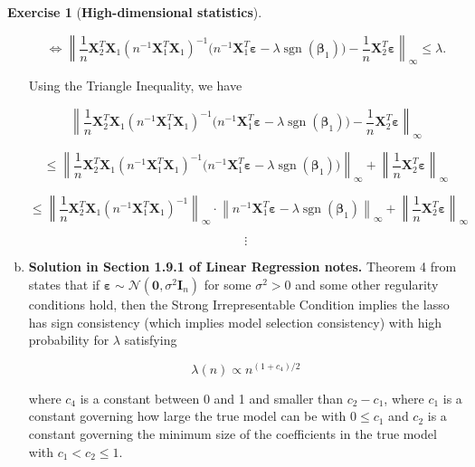 \documentclass{article}
\theoremstyle{definition}
\newtheorem{exercise}{Exercise}
\theoremstyle{definition}
\theoremstyle{definition}
\theoremstyle{definition}
\renewcommand{\epsilon}{\varepsilon}
\renewcommand{\epsilon}{\varepsilon}
\begin{document}
\begin{exercise}[\textbf{High-dimensional statistics}]
\begin{enumerate}[(a)]
\[
\iff \left\lVert \frac{1}{n} \boldsymbol{X}_{2}^T \boldsymbol{X}_1 (n^{-1} \boldsymbol{X}_1^T\boldsymbol{X}_1)^{-1} \big( n^{-1} \boldsymbol{X}_1^T \boldsymbol{\epsilon} -  \lambda  \operatorname{sgn}(\boldsymbol{\beta}_1)\big)    -  \frac{1}{n} \boldsymbol{X}_{2}^T \boldsymbol{\epsilon} \right\rVert_\infty \leq \lambda.
\]

Using the Triangle Inequality, we have

\[
\left\lVert \frac{1}{n} \boldsymbol{X}_{2}^T \boldsymbol{X}_1 (n^{-1} \boldsymbol{X}_1^T\boldsymbol{X}_1)^{-1} \big( n^{-1} \boldsymbol{X}_1^T \boldsymbol{\epsilon} -  \lambda  \operatorname{sgn}(\boldsymbol{\beta}_1)\big)    -  \frac{1}{n} \boldsymbol{X}_{2}^T \boldsymbol{\epsilon} \right\rVert_\infty 
\]

\[
\leq \left\lVert \frac{1}{n} \boldsymbol{X}_{2}^T \boldsymbol{X}_1 (n^{-1} \boldsymbol{X}_1^T\boldsymbol{X}_1)^{-1} \big( n^{-1} \boldsymbol{X}_1^T \boldsymbol{\epsilon} -  \lambda  \operatorname{sgn}(\boldsymbol{\beta}_1)\big)  \right\rVert_\infty + \left\lVert  \frac{1}{n} \boldsymbol{X}_{2}^T \boldsymbol{\epsilon} \right\rVert_\infty 
\]

\begin{equation}\label{linreg.lasso.bound.cond.cont.more}
\leq \left\lVert \frac{1}{n} \boldsymbol{X}_{2}^T  \boldsymbol{X}_1 (n^{-1} \boldsymbol{X}_1^T\boldsymbol{X}_1)^{-1} \right\rVert_\infty \cdot \left\lVert  n^{-1} \boldsymbol{X}_1^T \boldsymbol{\epsilon} -  \lambda  \operatorname{sgn}(\boldsymbol{\beta}_1)    \right\rVert_\infty + \left\lVert  \frac{1}{n} \boldsymbol{X}_{2}^T \boldsymbol{\epsilon} \right\rVert_\infty 
\end{equation}

\[
\vdots
\]

\item \textbf{Solution in Section 1.9.1 of Linear Regression notes.} Theorem 4 from \citet{Zhao2006} states that if \(\boldsymbol{\epsilon} \sim \mathcal{N}(\boldsymbol{0}, \sigma^2 \boldsymbol{I}_n)\) for some \(\sigma^2 > 0\) and some other regularity conditions hold, then the Strong Irrepresentable Condition implies the lasso has sign consistency (which implies model selection consistency) with high probability for \(\lambda\) satisfying

\[
\lambda(n) \propto n^{(1+c_4)/2}
\]

where \(c_4\) is a constant between 0 and 1 and smaller than \(c_2 - c_1\), where \(c_1\) is a constant governing how large the true model can be with \(0 \leq c_1\) and \(c_2\) is a constant governing the minimum size of the coefficients in the true model with \(c_1 < c_2 \leq 1\).


\end{enumerate}
\end{exercise}
\end{document}
